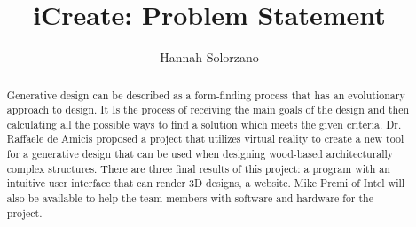 \documentclass[letterpaper,draftclsnofoot,onecolumn,10 pt]{IEEEtran}
\title{iCreate: Problem Statement}
\author{Hannah Solorzano}
\begin{document}
\maketitle

\begin{abstract}
	Generative design can be described as a form-finding process that has an evolutionary approach to design. It Is the process of receiving the main goals of the design and then calculating all the possible ways to find a solution which meets the given criteria. Dr. Raffaele de Amicis proposed a project that utilizes virtual reality to create a new tool for a generative design that can be used when designing wood-based architecturally complex structures. There are three final results of this project: a program with an intuitive user interface that can render 3D designs, a website. Mike Premi of Intel will also be available to help the team members with software and hardware for the project. 

\end{abstract}
\end{document}
